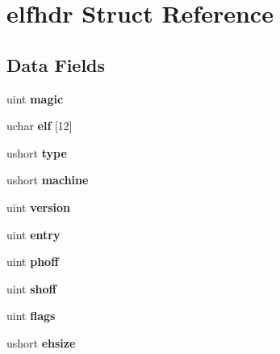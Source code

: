 \hypertarget{structelfhdr}{}\section{elfhdr Struct Reference}
\label{structelfhdr}
\subsection*{Data Fields}
\begin{DoxyCompactItemize}
\item 
\mbox{\label{structelfhdr_a28ee8116d69b533277311c5f3773b6b2}} 
uint {\bfseries magic}
\item 
\mbox{\label{structelfhdr_a22ec6f2383f0488ee18a18673398f201}} 
uchar {\bfseries elf} \mbox{[}12\mbox{]}
\item 
\mbox{\label{structelfhdr_a2cd2eaf0c952e30f8196890787ef68fe}} 
ushort {\bfseries type}
\item 
\mbox{\label{structelfhdr_a17113c58d39b044bb1ae78733a8c68fc}} 
ushort {\bfseries machine}
\item 
\mbox{\label{structelfhdr_abb1c8274f47cfdbbcefe44af2d5c723d}} 
uint {\bfseries version}
\item 
\mbox{\label{structelfhdr_ad40755e1b2c6efc3ec0ad95889f743a5}} 
uint {\bfseries entry}
\item 
\mbox{\label{structelfhdr_a1d463f67fcf951c06cfaa37850004c51}} 
uint {\bfseries phoff}
\item 
\mbox{\label{structelfhdr_a465ccdf83d0e26d129d723a493a6e764}} 
uint {\bfseries shoff}
\item 
\mbox{\label{structelfhdr_a2f1e0957c83938630ef0ed074830df03}} 
uint {\bfseries flags}
\item 
\mbox{\label{structelfhdr_aeffe5743cc720e5795af5d17b6fd6928}} 
ushort {\bfseries ehsize}
\item 
\mbox{\label{structelfhdr_ac636a4a9c4c61933c6044275ed687bc9}} 

\end{DoxyCompactItemize}
